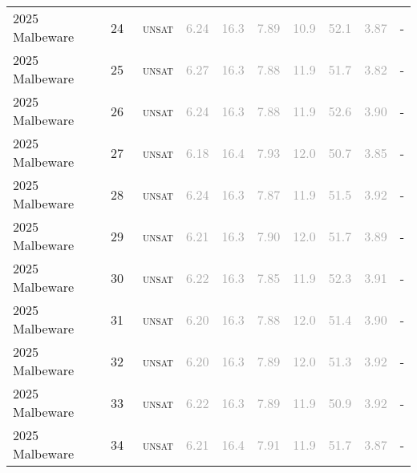 \begin{center}
{\begin{longtable}{@{}llllllllll@{}}
2025 Malbeware & 24 & ~\textsc{unsat} & \textcolor{darkgray}{6.24} & \textcolor{darkgray}{16.3} & \textcolor{darkgray}{7.89} & \textcolor{darkgray}{10.9} & \textcolor{darkgray}{52.1} & \textcolor{darkgray}{3.87} & - \\
2025 Malbeware & 25 & ~\textsc{unsat} & \textcolor{darkgray}{6.27} & \textcolor{darkgray}{16.3} & \textcolor{darkgray}{7.88} & \textcolor{darkgray}{11.9} & \textcolor{darkgray}{51.7} & \textcolor{darkgray}{3.82} & - \\
2025 Malbeware & 26 & ~\textsc{unsat} & \textcolor{darkgray}{6.24} & \textcolor{darkgray}{16.3} & \textcolor{darkgray}{7.88} & \textcolor{darkgray}{11.9} & \textcolor{darkgray}{52.6} & \textcolor{darkgray}{3.90} & - \\
2025 Malbeware & 27 & ~\textsc{unsat} & \textcolor{darkgray}{6.18} & \textcolor{darkgray}{16.4} & \textcolor{darkgray}{7.93} & \textcolor{darkgray}{12.0} & \textcolor{darkgray}{50.7} & \textcolor{darkgray}{3.85} & - \\
2025 Malbeware & 28 & ~\textsc{unsat} & \textcolor{darkgray}{6.24} & \textcolor{darkgray}{16.3} & \textcolor{darkgray}{7.87} & \textcolor{darkgray}{11.9} & \textcolor{darkgray}{51.5} & \textcolor{darkgray}{3.92} & - \\
2025 Malbeware & 29 & ~\textsc{unsat} & \textcolor{darkgray}{6.21} & \textcolor{darkgray}{16.3} & \textcolor{darkgray}{7.90} & \textcolor{darkgray}{12.0} & \textcolor{darkgray}{51.7} & \textcolor{darkgray}{3.89} & - \\
2025 Malbeware & 30 & ~\textsc{unsat} & \textcolor{darkgray}{6.22} & \textcolor{darkgray}{16.3} & \textcolor{darkgray}{7.85} & \textcolor{darkgray}{11.9} & \textcolor{darkgray}{52.3} & \textcolor{darkgray}{3.91} & - \\
2025 Malbeware & 31 & ~\textsc{unsat} & \textcolor{darkgray}{6.20} & \textcolor{darkgray}{16.3} & \textcolor{darkgray}{7.88} & \textcolor{darkgray}{12.0} & \textcolor{darkgray}{51.4} & \textcolor{darkgray}{3.90} & - \\
2025 Malbeware & 32 & ~\textsc{unsat} & \textcolor{darkgray}{6.20} & \textcolor{darkgray}{16.3} & \textcolor{darkgray}{7.89} & \textcolor{darkgray}{12.0} & \textcolor{darkgray}{51.3} & \textcolor{darkgray}{3.92} & - \\
2025 Malbeware & 33 & ~\textsc{unsat} & \textcolor{darkgray}{6.22} & \textcolor{darkgray}{16.3} & \textcolor{darkgray}{7.89} & \textcolor{darkgray}{11.9} & \textcolor{darkgray}{50.9} & \textcolor{darkgray}{3.92} & - \\
2025 Malbeware & 34 & ~\textsc{unsat} & \textcolor{darkgray}{6.21} & \textcolor{darkgray}{16.4} & \textcolor{darkgray}{7.91} & \textcolor{darkgray}{11.9} & \textcolor{darkgray}{51.7} & \textcolor{darkgray}{3.87} & - \\

\end{longtable}}
\end{center}
